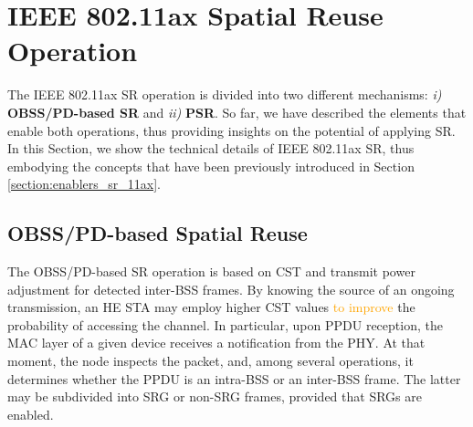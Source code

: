 \documentclass{ieeeaccess}
\begin{document}

\section{IEEE 802.11ax Spatial Reuse Operation}
\label{section:operation_sr_11ax}
The IEEE 802.11ax SR operation is divided into two different mechanisms: \emph{i)} \textbf{OBSS/PD-based SR} and \emph{ii)} \textbf{PSR}. So far, we have described the elements that enable both operations, thus providing insights on the potential of applying SR. In this Section, we show the technical details of IEEE 802.11ax SR, thus embodying the concepts that have been previously introduced in Section \ref{section:enablers_sr_11ax}.

\subsection{OBSS/PD-based Spatial Reuse}
\label{section:obss_pd_based}
The OBSS/PD-based SR operation is based on CST and transmit power adjustment for detected inter-BSS frames. By knowing the source of an ongoing transmission, an HE STA may employ higher CST values \textcolor{orange}{to improve} the probability of accessing the channel. In particular, upon PPDU reception, the MAC layer of a given device receives a notification from the PHY. At that moment, the node inspects the packet, and, among several operations, it determines whether the PPDU is an intra-BSS or an inter-BSS frame. The latter may be subdivided into SRG or non-SRG frames, provided that SRGs are enabled.

\end{document}

